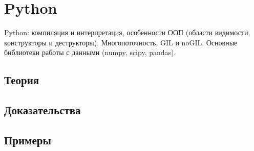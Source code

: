 
\section{Python}
\label{sec:2.3b.04-python}

\begin{ticket}
Python: компиляция и интерпретация, особенности ООП (области видимости, конструкторы и деструкторы). Многопоточность, GIL и noGIL. Основные библиотеки работы с данными (numpy, scipy, pandas).
\end{ticket}

\subsection*{Теория}

\subsection*{Доказательства}

\subsection*{Примеры}
